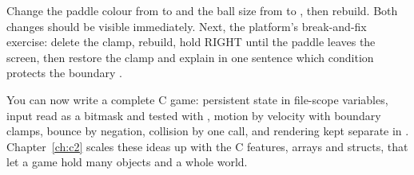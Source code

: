 \begin{prgtry}
Change the paddle colour from  to
 and the ball size from  to , then
rebuild. Both changes should be visible immediately. Next, the platform's
break-and-fix exercise: delete the  clamp, rebuild, hold
RIGHT until the paddle leaves the screen, then restore the clamp and explain in one
sentence which condition protects the boundary \citep{prg32tutorialc}.
\end{prgtry}

\begin{prgcheck}
You can now write a complete C game: persistent state in file-scope variables,
input read as a bitmask and tested with \code{\&}, motion by velocity with
boundary clamps, bounce by negation, collision by one call, and rendering kept
separate in . Chapter~\ref{ch:c2} scales these ideas up with the C
features, arrays and structs, that let a game hold many objects and a whole
world.
\end{prgcheck}
